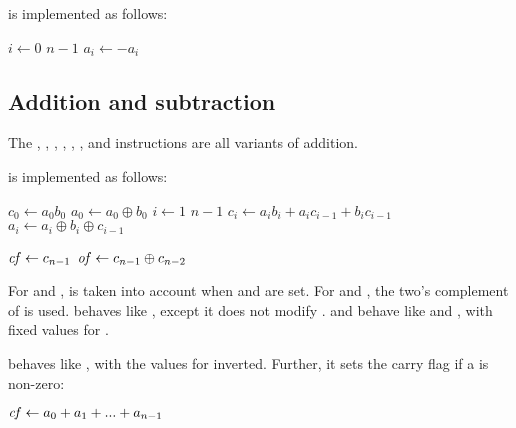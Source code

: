 \documentclass[a4paper,11pt]{kth-mag}
\renewcommand{\gets}{\leftarrow}
\newcommand{\AND}{}
\newcommand{\IOR}{+}
\newcommand{\XOR}{\oplus}
\newcommand{\NOT}{-}
\begin{document}
 is implemented as follows:

\begin{codebox}
\zi \For $i \gets 0$ \To $n-1$
\zi \Do
      $a_i \gets \NOT a_i$
    \End
\end{codebox}

\subsection{Addition and subtraction}

The , , , , , ,  and  instructions are all variants of addition.

 is implemented as follows:

\begin{codebox}
\zi $c_0 \gets a_0 \AND b_0$
\zi $a_0 \gets a_0 \XOR b_0$
\zi \For $i \gets 1$ \To $n-1$
\zi \Do
      $c_i \gets a_i \AND b_i \IOR a_i \AND c_{i-1} \IOR b_i \AND c_{i-1}$
\zi   $a_i \gets a_i \XOR b_i \XOR c_{i-1}$
    \End
\end{codebox}

\begin{codebox}
\zi $\id{cf} \gets c_{n-1}$
\zi $\id{of} \gets c_{n-1} \XOR c_{n-2}$
\end{codebox}

For  and ,  is taken into account when  and  are set.
For  and , the two's complement of  is used.
 behaves like , except it does not modify .
 and  behave like  and , with fixed values for .

 behaves like , with the values for  inverted.
Further, it sets the carry flag if a is non-zero:

\begin{codebox}
\zi $\id{cf} \gets a_0 + a_1 + ... + a_{n-1}$
\end{codebox}



\end{document}
